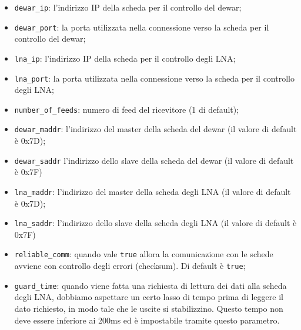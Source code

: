 \begin{itemize}
\item \texttt{dewar\_ip}: l'indirizzo IP della scheda per il controllo del dewar;
\item \texttt{dewar\_port}: la porta utilizzata nella 
connessione verso la scheda per il controllo del dewar;
\item \texttt{lna\_ip}: l'indirizzo IP della scheda per il controllo degli LNA;
\item \texttt{lna\_port}: la porta utilizzata nella 
connessione verso la scheda per il controllo degli LNA;
\item \texttt{number\_of\_feeds}: numero di feed del ricevitore (1 di default);
\item \texttt{dewar\_maddr}: l'indirizzo del master della
scheda del dewar (il valore di default \`e 0x7D);
\item \texttt{dewar\_saddr} l'indirizzo dello slave della 
scheda del dewar (il valore di default \`e 0x7F)
\item \texttt{lna\_maddr}: l'indirizzo del master della 
scheda degli LNA (il valore di default \`e 0x7D);
\item \texttt{lna\_saddr}: l'indirizzo dello slave della 
scheda degli LNA (il valore di default \`e 0x7F)
\item \texttt{reliable\_comm}: 
quando vale  \texttt{true} allora la comunicazione con le schede avviene
con controllo degli errori (checksum). Di default \`e \texttt{true};
\item \texttt{guard\_time}: 
quando viene fatta una richiesta di lettura dei dati alla scheda degli LNA,
dobbiamo aspettare un certo lasso di tempo prima di leggere il dato richiesto, in modo tale che le
uscite si stabilizzino. Questo tempo non deve essere inferiore ai 200ms ed \`e impostabile tramite questo
parametro.
\end{itemize}
    
